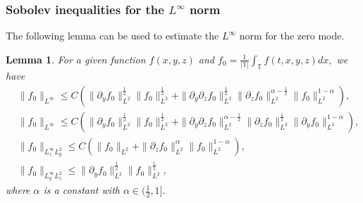 \documentclass[12pt, reqno]{amsart}
\newtheorem{lemma}{Lemma}[section]
\numberwithin{equation}{section}
\begin{document}
	
	\subsubsection{Sobolev inequalities for the $L^{\infty}$ norm}
	
	The following lemma can be used to estimate the $L^{\infty}$ norm for the zero mode.
	\begin{lemma}\label{sob_inf_1}
		For a given function $f(x,y,z)$ and $f_0=\frac{1}{|\mathbb{T}|}\int_{\mathbb{T}}{f}(t,x,y,z)dx,$ we have
		\begin{equation}\label{sob_result_1}
			\begin{aligned}
				&\|f_0\|_{L^{\infty}}\leq C\left(\|\partial_yf_0\|^{\frac{1}{2}}_{L^2}\|f_0\|^{\frac{1}{2}}_{L^2}+\|\partial_y\partial_zf_0\|^{\frac{1}{2}}_{L^2}
				\|\partial_zf_0\|^{\alpha-\frac{1}{2}}_{L^2}
				\|f_0\|^{1-\alpha}_{L^2}\right),\\
				&\|f_0\|_{L^{\infty}}
				\leq 
				C\left(\|\partial_yf_0\|^{\frac{1}{2}}_{L^2}\|f_0\|^{\frac{1}{2}}_{L^2}+\|\partial_y\partial_zf_0\|^{\alpha-\frac{1}{2}}_{L^2}
				\|\partial_zf_0\|^{\frac{1}{2}}_{L^2}
				\|\partial_yf_0\|^{1-\alpha}_{L^2}\right),\\
				&\|f_{0}\|_{L^{\infty}_{z}L^2_y}\leq C\left(\|f_0\|_{L^2}+\|\partial_zf_0\|_{L^2}^{\alpha}\|f_0\|_{L^2}^{1-\alpha}\right),\\
				&\|f_{0}\|_{L^{\infty}_yL^{2}_{z}}
				\leq \|\partial_yf_0\|_{L^2}^{\frac{1}{2}}
				\|f_0\|_{L^2}^{\frac{1}{2}},
			\end{aligned}
		\end{equation}	
		where $\alpha$ is a constant with $\alpha\in(\frac{1}{2},1].$
	\end{lemma}
\end{document}
